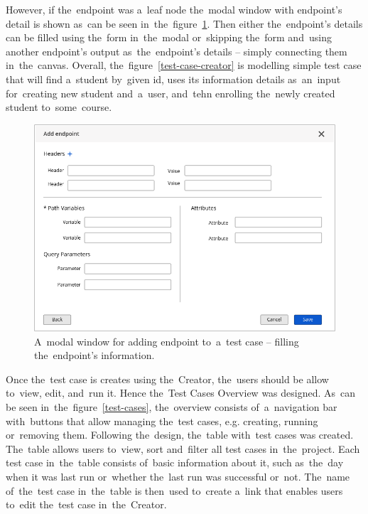 However, if the~endpoint was a~leaf node the~modal window with endpoint's detail
is shown as~can be seen in~the~figure~\ref{add-endpoint-2}. Then either
the~endpoint's details can be filled using the~form in~the~modal or~skipping
the~form and~using another endpoint's output as~the~endpoint's details -- simply
connecting them in~the~canvas. Overall, the~figure~\ref{test-case-creator} is
modelling simple test case that will find a~student by~given id, uses its
information details as~an~input for~creating new student and~a~user, and~tehn
enrolling the~newly created student to~some~course.

\begin{figure}[!hbt]
	\centering
	\includegraphics[scale=0.4]{./designs/drafts-1.0/add-endpoint-2.png}
	\caption{A~modal window for adding endpoint to~a~test case -- filling
	the~endpoint's information.}
	\label{add-endpoint-2}
\end{figure}

Once the~test case is creates using the~Creator, the~users should be allow
to~view, edit, and~run it. Hence the~Test Cases Overview was designed. As~can be
seen in~the~figure~\ref{test-cases}, the~overview consists of~a~navigation bar
with~buttons that allow managing the~test cases, e.g. creating, running
or~removing them. Following the~design, the~table with~test cases was created.
The~table allows users to~view, sort and~filter all test cases in~the~project.
Each test case in~the~table consists of~basic information about it, such
as~the~day when it was last run or~whether the~last run was successful or~not.
The~name of~the~test case in~the~table is then~used to~create a~link that
enables users to~edit the~test case in~the~Creator.

